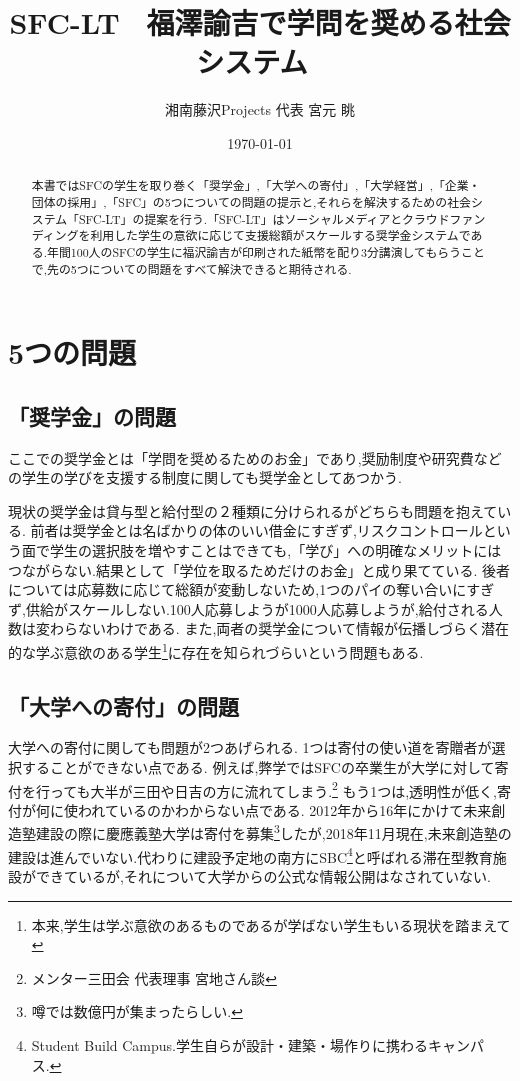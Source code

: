 \documentclass[uplatex, a4j]{jsarticle}
\date{\today}
\title{SFC-LT ~福澤諭吉で学問を奨める社会システム~}
\author{湘南藤沢Projects 代表 宮元 眺}
\begin{document}


\maketitle
\begin{abstract}
  本書ではSFCの学生を取り巻く「奨学金」,「大学への寄付」,「大学経営」,「企業・団体の採用」,「SFC」の5つについての問題の提示と,それらを解決するための社会システム「SFC-LT」の提案を行う.「SFC-LT」はソーシャルメディアとクラウドファンディングを利用した学生の意欲に応じて支援総額がスケールする奨学金システムである.年間100人のSFCの学生に福沢諭吉が印刷された紙幣を配り3分講演してもらうことで,先の5つについての問題をすべて解決できると期待される.

\end{abstract}

\section{5つの問題}

\subsection{「奨学金」の問題}
  ここでの奨学金とは「学問を奨めるためのお金」であり,奨励制度や研究費などの学生の学びを支援する制度に関しても奨学金としてあつかう.

  現状の奨学金は貸与型と給付型の２種類に分けられるがどちらも問題を抱えている.
  前者は奨学金とは名ばかりの体のいい借金にすぎず,リスクコントロールという面で学生の選択肢を増やすことはできても,「学び」への明確なメリットにはつながらない.結果として「学位を取るためだけのお金」と成り果てている.
  後者については応募数に応じて総額が変動しないため,1つのパイの奪い合いにすぎず,供給がスケールしない.100人応募しようが1000人応募しようが,給付される人数は変わらないわけである.
  また,両者の奨学金について情報が伝播しづらく潜在的な学ぶ意欲のある学生\footnote{本来,学生は学ぶ意欲のあるものであるが学ばない学生もいる現状を踏まえて}に存在を知られづらいという問題もある.


\subsection{「大学への寄付」の問題}
  大学への寄付に関しても問題が2つあげられる.
  1つは寄付の使い道を寄贈者が選択することができない点である.
  例えば,弊学ではSFCの卒業生が大学に対して寄付を行っても大半が三田や日吉の方に流れてしまう.\footnote{メンター三田会 代表理事 宮地さん談}
  もう1つは,透明性が低く,寄付が何に使われているのかわからない点である.
  2012年から16年にかけて未来創造塾建設の際に慶應義塾大学は寄付を募集\footnote{噂では数億円が集まったらしい.}したが,2018年11月現在,未来創造塾の建設は進んでいない.代わりに建設予定地の南方にSBC\footnote{Student Build Campus.学生自らが設計・建築・場作りに携わるキャンパス.}と呼ばれる滞在型教育施設ができているが,それについて大学からの公式な情報公開はなされていない\cite{mirai}.
\end{document}
